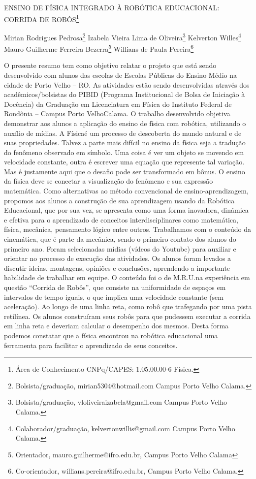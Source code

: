 \documentclass[article,12pt,onesidea,4paper,english,brazil]{abntex2}
\begin{document}
	
	
	\frenchspacing 
	
	\begin{center}
		\LARGE ENSINO DE FÍSICA INTEGRADO À ROBÓTICA EDUCACIONAL: CORRIDA DE ROBÔS\footnote{Área de Conhecimento CNPq/CAPES: 1.05.00.00-6 Física.}
		
		\normalsize
		Mirian Rodrigues Pedrosa\footnote{Bolsista/graduação, mirian5304@hotmail.com Campus Porto Velho Calama.} 
		Izabela Vieira Lima de Oliveira\footnote{Bolsista/graduação, vloliveiraizabela@gmail.com Campus Porto Velho Calama.} 
		Kelverton Willes\footnote{Colaborador/graduação, kelvertonwillis@gmail.com Campus Porto Velho Calama.}\\ 
		Mauro Guilherme Ferreira Bezerra\footnote{Orientador, mauro.guilherme@ifro.edu.br, Campus Porto Velho Calama} 
		Willians de Paula Pereira\footnote{Co-orientador, willians.pereira@ifro.edu.br, Campus Porto Velho Calama.}
	\end{center}
	
	\noindent O presente resumo tem como objetivo relatar o projeto que está sendo desenvolvido com alunos das escolas de Escolas Públicas do Ensino Médio na cidade de Porto Velho – RO.  As atividades estão sendo desenvolvidas através dos acadêmicos/bolsistas do PIBID (Programa Institucional de Bolsa de Iniciação à Docência) da Graduação em Licenciatura em Física do Instituto Federal de Rondônia – Campus Porto VelhoCalama. O trabalho desenvolvido objetiva demonstrar aos alunos a aplicação do ensino de física com robótica, utilizando o auxílio de mídias. A Físicaé um processo de descoberta do mundo natural e de suas propriedades. Talvez a parte mais difícil no ensino da física seja a tradução do fenômeno observado em símbolo. Uma coisa é ver um objeto se movendo em velocidade constante, outra é escrever uma equação que represente tal variação. Mas é justamente aqui que o desafio pode ser transformado em bônus. O ensino da física deve se conectar a visualização do fenômeno e sua expressão matemática. Como alternativas ao método convencional de ensino-aprendizagem, propomos aos alunos a construção de sua aprendizagem usando da Robótica Educacional, que por sua vez, se apresenta como uma forma inovadora, dinâmica e efetiva para o aprendizado de conceitos interdisciplinares como matemática, física, mecânica, pensamento lógico entre outros. Trabalhamos com o conteúdo da cinemática, que é parte da mecânica, sendo o primeiro contato dos alunos do primeiro ano. Foram selecionadas mídias (vídeos do Youtube) para auxiliar e orientar no processo de execução das atividades. Os alunos foram levados a discutir ideias, montagens, opiniões e conclusões, aprendendo a importante habilidade de trabalhar em equipe. O conteúdo foi o de M.R.U.na experiência em questão “Corrida de Robôs”, que consiste na uniformidade de espaços em intervalos de tempo iguais, o que implica uma velocidade constante (sem aceleração). Ao longo de uma linha reta, como robô que trafegando por uma pista retilínea. Os alunos construíram seus robôs para que pudessem executar a corrida em linha reta e deveriam calcular o desempenho dos mesmos. Desta forma podemos constatar que a física encontrou na robótica educacional uma ferramenta para facilitar o aprendizado de seus conceitos.
	
\end{document}
